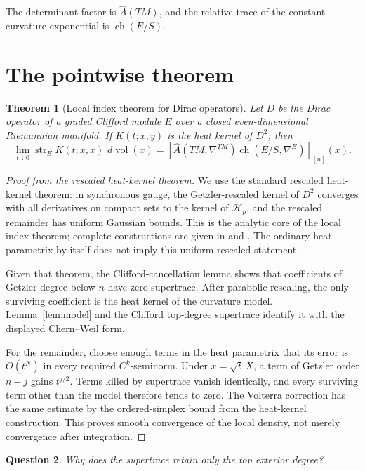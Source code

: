 \documentclass[11pt,oneside,reqno]{book}
\newcommand{\Ahat}{\widehat A}
\newcommand{\dd}{\,d}
\theoremstyle{plain}
\newtheorem{theorem}{Theorem}[chapter]
\newtheorem{question}[theorem]{Question}
\theoremstyle{definition}
\theoremstyle{remark}
\begin{document}
The determinant factor is \(\Ahat(TM)\), and the relative trace of the
constant curvature exponential is \(\operatorname{ch}(E/S)\).

\section{The pointwise theorem}

\begin{theorem}[Local index theorem for Dirac operators]\label{thm:local-index}
Let \(D\) be the Dirac operator of a graded Clifford module \(E\) over a
closed even-dimensional Riemannian manifold. If \(K(t;x,y)\) is the heat
kernel of \(D^2\), then
\[
 \lim_{t\downarrow0}
 \operatorname{str}_E K(t;x,x)\,\dd\operatorname{vol}(x)
 =
 \left[
 \Ahat(TM,\nabla^{TM})
 \operatorname{ch}(E/S,\nabla^E)
 \right]_{[n]}(x).
\]
\end{theorem}

\begin{proof}[Proof from the rescaled heat-kernel theorem]
We use the standard rescaled heat-kernel theorem: in synchronous gauge,
the Getzler-rescaled kernel of \(D^2\) converges with all derivatives on
compact sets to the kernel of \(\mathcal H_p\), and the rescaled remainder
has uniform Gaussian bounds. This is the analytic core of the local index
theorem; complete constructions are given in \cite[Chapters~4--5]{BGV}
and \cite{Gilkey}. The ordinary heat parametrix by itself does not imply
this uniform rescaled statement.

Given that theorem, the Clifford-cancellation lemma shows that
coefficients of Getzler degree below \(n\) have zero supertrace. After parabolic rescaling,
the only surviving coefficient is the heat kernel of the curvature model.
Lemma~\ref{lem:model} and the Clifford top-degree supertrace identify it with the
displayed Chern--Weil form.

For the remainder, choose enough terms in the heat parametrix that its
error is \(O(t^N)\) in every required \(C^k\)-seminorm. Under
\(x=\sqrt t\,X\), a term of Getzler order \(n-j\) gains \(t^{j/2}\).
Terms killed by supertrace vanish identically, and every surviving term
other than the model therefore tends to zero. The Volterra correction has
the same estimate by the ordered-simplex bound from the heat-kernel
construction. This proves smooth convergence of the local density, not
merely convergence after integration.
\end{proof}

\begin{question}
Why does the supertrace retain only the top exterior degree?
\end{question}
\end{document}
